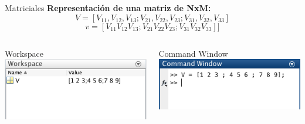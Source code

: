 \documentclass{bredelebeamer}
\begin{document}
\begin{frame}{Matriciales}
\textbf{Representación de una matriz de NxM:}
\begin{equation*}
V = [V_{11},V_{12},V_{13} ; V_{21},V_{22},V_{23} ; V_{31},V_{32},V_{33}]
\end{equation*}
\begin{equation*}
v = [V_{11} V_{12} V_{13} ; V_{21} V_{22} V_{23} ; V_{31} V_{32} V_{33}]]
\end{equation*}
\begin{columns}
\begin{column}{0.5\textwidth}
\begin{center}
Workspace\\
\includegraphics[scale=0.5]{images/pantalla10.png}
\end{center}
\end{column}
\begin{column}{0.5\textwidth}
\begin{center}
Command Window\\
\includegraphics[scale=0.5]{images/pantalla11.png}
\end{center}
\end{column}
\end{columns}
\end{frame}
\end{document}
